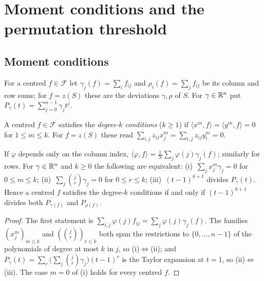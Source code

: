 \section{Moment conditions and the permutation threshold}
\label{sec:theory}

\subsection{Moment conditions}
\label{sec:theory_hierarchy}

For a centred $f\in\mathcal F$ let $\gamma_j(f)=\sum_if_{ij}$ and $\rho_i(f)=\sum_jf_{ij}$ be its column and row sums; for $f=z(S)$ these are the deviations $\gamma,\rho$ of $S$.
For $\gamma\in\mathbb{R}^n$ put $P_\gamma(t)=\sum_{j=0}^{n-1}\gamma_jt^j$.

\begin{definition}
\label{def:degree_k}
A centred $f\in\mathcal F$ satisfies the \emph{degree-$k$ conditions} ($k\ge1$) if $\langle x^{m},f\rangle=\langle y^{m},f\rangle=0$ for $1\le m\le k$.
For $f=z(S)$ these read $\sum_{i,j}z_{ij}x_j^m=\sum_{i,j}z_{ij}y_i^m=0$.
\end{definition}

\begin{lemma}
\label{lem:poly_form}
If $\varphi$ depends only on the column index, $\langle\varphi,f\rangle=\frac1N\sum_j\varphi(j)\gamma_j(f)$; similarly for rows.
For $\gamma\in\mathbb{R}^{n}$ and $k\ge0$ the following are equivalent:
(i)~$\sum_jx_j^{m}\gamma_j=0$ for $0\le m\le k$;
(ii)~$\sum_j\binom{j}{r}\gamma_j=0$ for $0\le r\le k$;
(iii)~$(t-1)^{k+1}$ divides $P_\gamma(t)$.
Hence a centred $f$ satisfies the degree-$k$ conditions if and only if $(t-1)^{k+1}$ divides both $P_{\gamma(f)}$ and $P_{\rho(f)}$.
\end{lemma}

\begin{proof}
The first statement is $\sum_{i,j}\varphi(j)f_{ij}=\sum_j\varphi(j)\gamma_j(f)$.
The families $(x_j^{m})_{m\le k}$ and $(\binom{j}{r})_{r\le k}$ both span the restrictions to $\{0,\dots,n-1\}$ of the polynomials of degree at most $k$ in $j$, so (i)$\Leftrightarrow$(ii); and $P_\gamma(t)=\sum_{r}\bigl(\sum_j\binom jr\gamma_j\bigr)(t-1)^{r}$ is the Taylor expansion at $t=1$, so (ii)$\Leftrightarrow$(iii).
The case $m=0$ of (i) holds for every centred $f$.
\end{proof}

